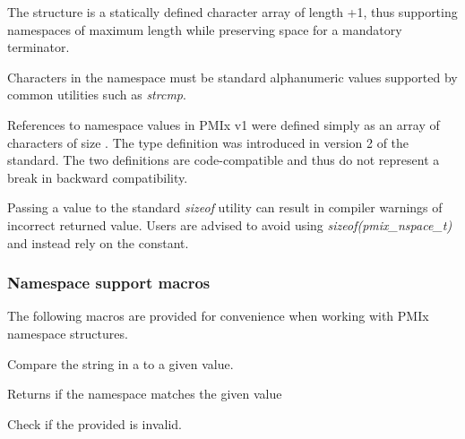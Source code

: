 The  structure is a statically defined character array of length +1, thus supporting namespaces of maximum length  while preserving space for a mandatory  terminator.


Characters in the namespace must be standard alphanumeric values supported by common utilities such as \textit{strcmp}.

\adviceuserstart
References to namespace values in \ac{PMIx} v1 were defined simply as an array of characters of size . The  type definition was introduced in version 2 of the standard. The two definitions are code-compatible and thus do not represent a break in backward compatibility.

Passing a  value to the standard \textit{sizeof} utility can result in compiler warnings of incorrect returned value. Users are advised to avoid using \textit{sizeof(pmix_nspace_t)} and instead rely on the  constant.
\adviceuserend

\subsubsection{Namespace support macros}

The following macros are provided for convenience when working with \ac{PMIx} namespace structures.


Compare the string in a  to a given value.


\begin{arglist}
\end{arglist}

Returns  if the namespace matches the given value


Check if the provided  is invalid.

